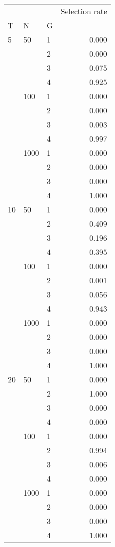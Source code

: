 \begin{tabular}{lllr}
\toprule
   &      &   &  Selection rate \\
T & N & G &                 \\
\midrule
5  & 50   & 1 &           0.000 \\
   &      & 2 &           0.000 \\
   &      & 3 &           0.075 \\
   &      & 4 &           0.925 \\
   & 100  & 1 &           0.000 \\
   &      & 2 &           0.000 \\
   &      & 3 &           0.003 \\
   &      & 4 &           0.997 \\
   & 1000 & 1 &           0.000 \\
   &      & 2 &           0.000 \\
   &      & 3 &           0.000 \\
   &      & 4 &           1.000 \\
10 & 50   & 1 &           0.000 \\
   &      & 2 &           0.409 \\
   &      & 3 &           0.196 \\
   &      & 4 &           0.395 \\
   & 100  & 1 &           0.000 \\
   &      & 2 &           0.001 \\
   &      & 3 &           0.056 \\
   &      & 4 &           0.943 \\
   & 1000 & 1 &           0.000 \\
   &      & 2 &           0.000 \\
   &      & 3 &           0.000 \\
   &      & 4 &           1.000 \\
20 & 50   & 1 &           0.000 \\
   &      & 2 &           1.000 \\
   &      & 3 &           0.000 \\
   &      & 4 &           0.000 \\
   & 100  & 1 &           0.000 \\
   &      & 2 &           0.994 \\
   &      & 3 &           0.006 \\
   &      & 4 &           0.000 \\
   & 1000 & 1 &           0.000 \\
   &      & 2 &           0.000 \\
   &      & 3 &           0.000 \\
   &      & 4 &           1.000 \\
\bottomrule
\end{tabular}
